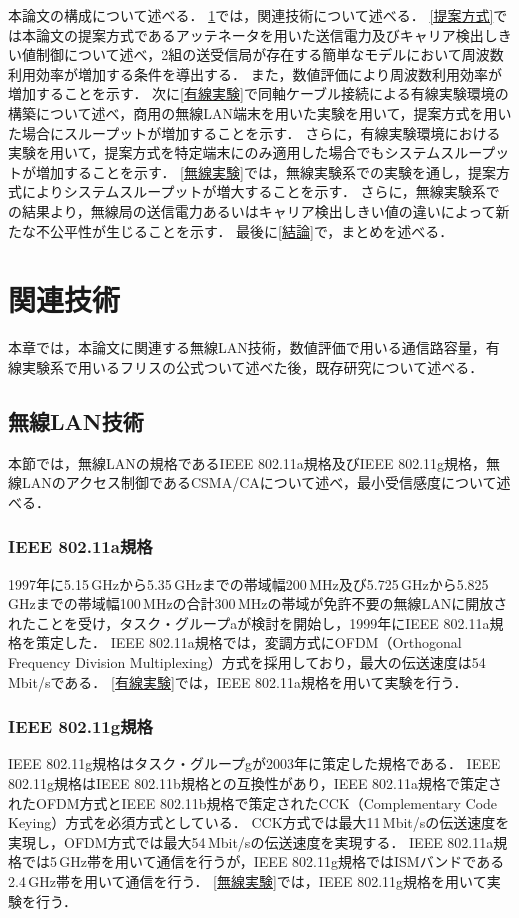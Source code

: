\documentclass[master]{kuisthesis}		%
\begin{document}
本論文の構成について述べる．
\ref{関連技術}では，関連技術について述べる．
\ref{提案方式}では本論文の提案方式であるアッテネータを用いた送信電力及びキャリア検出しきい値制御について述べ，2組の送受信局が存在する簡単なモデルにおいて周波数利用効率が増加する条件を導出する．
また，数値評価により周波数利用効率が増加することを示す．
次に\ref{有線実験}で同軸ケーブル接続による有線実験環境の構築について述べ，商用の無線LAN端末を用いた実験を用いて，提案方式を用いた場合にスループットが増加することを示す．
さらに，有線実験環境における実験を用いて，提案方式を特定端末にのみ適用した場合でもシステムスループットが増加することを示す．
\ref{無線実験}では，無線実験系での実験を通し，提案方式によりシステムスループットが増大することを示す．
さらに，無線実験系での結果より，無線局の送信電力あるいはキャリア検出しきい値の違いによって新たな不公平性が生じることを示す．
最後に\ref{結論}で，まとめを述べる．

\section{関連技術} \label{関連技術}
本章では，本論文に関連する無線LAN技術\cite{musenlan}，数値評価で用いる通信路容量\cite{houshiki}，有線実験系で用いるフリスの公式ついて述べた後，既存研究について述べる．
\subsection{無線LAN技術}
本節では，無線LANの規格であるIEEE 802.11a規格及びIEEE 802.11g規格，無線LANのアクセス制御であるCSMA/CAについて述べ，最小受信感度について述べる．
\subsubsection{IEEE 802.11a規格}
1997年に5.15\,GHzから5.35\,GHzまでの帯域幅200\,MHz及び5.725\,GHzから5.825\,GHzまでの帯域幅100\,MHzの合計300\,MHzの帯域が免許不要の無線LANに開放されたことを受け，タスク・グループaが検討を開始し，1999年にIEEE 802.11a規格を策定した．
IEEE 802.11a規格では，変調方式にOFDM（Orthogonal Frequency Division Multiplexing）方式を採用しており，最大の伝送速度は54\,Mbit/sである．
\ref{有線実験}では，IEEE 802.11a規格を用いて実験を行う．

\subsubsection{IEEE 802.11g規格}
IEEE 802.11g規格はタスク・グループgが2003年に策定した規格である．
IEEE 802.11g規格はIEEE 802.11b規格との互換性があり，IEEE 802.11a規格で策定されたOFDM方式とIEEE 802.11b規格で策定されたCCK（Complementary Code Keying）方式を必須方式としている．
CCK方式では最大11\,Mbit/sの伝送速度を実現し，OFDM方式では最大54\,Mbit/sの伝送速度を実現する．
IEEE 802.11a規格では5\,GHz帯を用いて通信を行うが，IEEE 802.11g規格ではISMバンドである2.4\,GHz帯を用いて通信を行う．
\ref{無線実験}では，IEEE 802.11g規格を用いて実験を行う．
\end{document}

